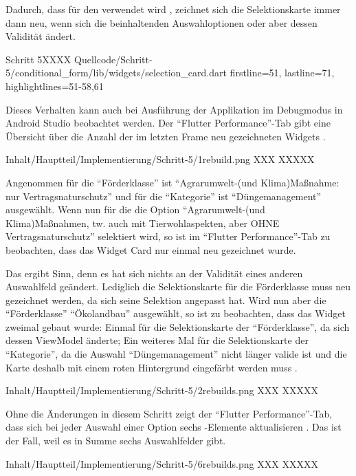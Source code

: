 Dadurch,
dass  für den  verwendet wird ,
zeichnet sich die Selektionskarte immer dann neu,
wenn sich die beinhaltenden Auswahloptionen oder aber dessen Validität ändert.


\begin{alexlisting}{Schritt 5}{XXXX}
  {Quellcode/Schritt-5/conditional_form/lib/widgets/selection_card.dart}
  {firstline=51, lastline=71, highlightlines={51-58,61}}
  \label{lst:Schritt5needsRepaint}
\end{alexlisting} 

Dieses Verhalten kann auch bei Ausführung der Applikation im Debugmodus in Android Studio beobachtet werden.
Der \enquote{Flutter Performance}-Tab gibt eine Übersicht über die Anzahl der im letzten Frame neu gezeichneten Widgets \Abb{\ref{fig:Schritt51rebuild}}. 
\begin{alexfigure}{Inhalt/Hauptteil/Implementierung/Schritt-5/1rebuild.png}
  {XXX}
  {XXXXX}

  \label{fig:Schritt51rebuild}

\end{alexfigure}
Angenommen für die \enquote{Förderklasse} ist \enquote{Agrarumwelt-(und Klima)Maßnahme: nur Vertragsnaturschutz} und für die \enquote{Kategorie} ist \enquote{Düngemanagement} ausgewählt.
Wenn nun für die  die Option \enquote{Agrarumwelt-(und Klima)Maßnahmen, tw. auch mit Tierwohlaspekten, aber OHNE Vertragsnaturschutz}  selektiert wird,
so ist im \enquote{Flutter Performance}-Tab zu beobachten,
dass das Widget Card nur einmal neu gezeichnet wurde.



Das ergibt Sinn, denn es hat sich nichts an der Validität eines anderen Auswahlfeld geändert.
Lediglich die Selektionskarte für die Förderklasse muss neu gezeichnet werden,
da sich seine Selektion angepasst hat.
Wird nun aber die \enquote{Förderklasse} \enquote{Ökolandbau} ausgewählt,
so ist zu beobachten,
dass das  Widget zweimal gebaut wurde:
Einmal für die Selektionskarte der \enquote{Förderklasse}, da sich dessen ViewModel änderte;
Ein weiteres Mal für die Selektionskarte der \enquote{Kategorie},
da die Auswahl \enquote{Düngemanagement} nicht länger valide ist
und die Karte deshalb mit einem roten Hintergrund eingefärbt werden muss \Abb{\ref{fig:Schritt52rebuilds}}.

\begin{alexfigure}{Inhalt/Hauptteil/Implementierung/Schritt-5/2rebuilds.png}
  {XXX}
  {XXXXX}

  \label{fig:Schritt52rebuilds}

\end{alexfigure}

Ohne die Änderungen in diesem Schritt zeigt der \enquote{Flutter Performance}-Tab, dass sich bei jeder Auswahl einer Option sechs -Elemente aktualisieren \Abb{\ref{fig:Schritt56rebuilds}}.
Das ist der Fall, weil es in Summe sechs Auswahlfelder gibt.

\begin{alexfigure}{Inhalt/Hauptteil/Implementierung/Schritt-5/6rebuilds.png}
  {XXX}
  {XXXXX}

  \label{fig:Schritt56rebuilds}

\end{alexfigure}

